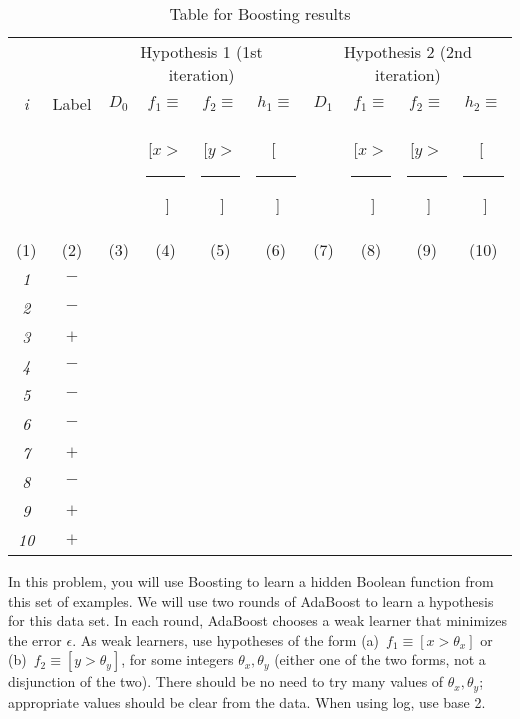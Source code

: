 \documentclass[11pt]{article}
\begin{document}
    \begin{table}[!t]
      {\centering
        \begin{tabular}{|c|c||c|c|c|c||c|c|c|c|}

          \hline
          & & \multicolumn{4}{c||}{Hypothesis 1 (1st iteration)}
	  & \multicolumn{4}{c|}{Hypothesis 2 (2nd iteration)} \\
          \cline{3-10}
          {\em i} & Label & $D_0$ & $f_1 \equiv $ & $f_2 \equiv $ & $h_1\equiv$ & $D_1$ &  $f_1 \equiv $ & $f_2 \equiv $ & $h_2 \equiv $ \\
          & & & [$x >$\rule[-2pt]{3mm}{0.2pt}$\;$] & [$y >$\rule[-2pt]{3mm}{0.2pt}$\;$] & [$\;$\rule[-2pt]{1cm}{0.2pt}$\;$] & & [$x >$\rule[-2pt]{3mm}{0.2pt}$\;$] & [$y >$\rule[-2pt]{3mm}{0.2pt}$\;$] & [$\;$\rule[-2pt]{1cm}{0.2pt}$\;$] \\

          \tiny{(1)} & \tiny{(2)} & \tiny{(3)} & \tiny{(4)} &  \tiny{(5)} & \tiny{(6)} & \tiny{(7)} & \tiny{(8)} & \tiny{(9)} & \tiny{(10)}\\
          \hline \hline
          {\em 1} & $-$ & & & & & & & &  \\
          \hline
          {\em 2} & $-$ & & & & & & & &  \\
          \hline
          {\em 3} & $+$ & & & & & & & & \\
          \hline
          {\em 4} & $-$ & & & & & & & & \\
          \hline
          {\em 5} & $-$ & & & & & & & & \\
          \hline
          {\em 6} & $-$ & & & & & & & & \\
          \hline
          {\em 7} & $+$ & & & & & & & & \\
          \hline
          {\em 8} & $-$ & & & & & & & & \\
          \hline
          {\em 9} & $+$ & & & & & & & & \\
          \hline
          {\em 10} & $+$ & & & & & & & & \\
          \hline
        \end{tabular}
        \caption{Table for Boosting results}\label{table:ltu}}
    \end{table}


  In this problem, you will use Boosting to learn a hidden Boolean function from this set of examples.
We will use two rounds of AdaBoost to learn a hypothesis for this
    data set. In each round, AdaBoost chooses a weak learner that minimizes the error $\epsilon$. As weak learners, use hypotheses of the form (a)~$f_1 \equiv [x
    > \theta_x]$ or (b)~$f_2 \equiv [y > \theta_y]$, for some integers $\theta_x, \theta_y$ (either one of the two forms, not a disjunction of the two). There should be no need to try many values of $\theta_x, \theta_y$;
    appropriate values should be clear from the data. When using log, use base 2. 
\end{document}
